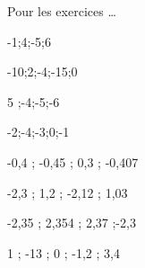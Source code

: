 Pour les exercices \dots

\begin{multicols}{4}
    -1;4;-5;6
    
    -10;2;-4;-15;0
    
    5 ;-4;-5;-6
    
    -2;-4;-3;0;-1
\end{multicols}

\begin{multicols}{4}
    -0,4 ; -0,45 ; 0,3 ; -0,407
    
    -2,3 ; 1,2 ; -2,12 ; 1,03
    
    -2,35 ; 2,354 ; 2,37 ;-2,3
    
    1 ; -13 ; 0 ; -1,2 ; 3,4
\end{multicols}